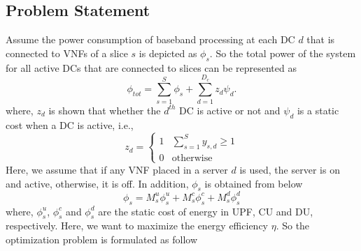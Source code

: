 \documentclass[conference]{IEEEtran}
\begin{document}
\subsection{Problem Statement}
Assume the power consumption of baseband processing at each DC $d$ that is connected to VNFs of a slice $s$ is depicted as
$\phi_{s}$. So the total power of the system for all active DCs that are connected to slices can be represented as
\begin{equation*}
\textstyle \phi_{tot} = \sum_{s=1}^{S}\phi_{s} + \sum_{d=1}^{D_c}z_d \psi_d .
\end{equation*}
where, $z_d$ is shown that whether the $d^{th}$ DC is active or not and $\psi_d$ is a static cost when a DC is active, i.e.,
\begin{equation}
  z_d =
    \begin{cases}
      1 & \sum_{s=1}^{S}y_{s,d} \geq 1 \\
      0 & \text{otherwise}
    \end{cases}       
\end{equation}  
Here, we assume that if any VNF placed in a server $d$ is used, the server is on and active, otherwise, it is off.
In addition, $\phi_{s}$ is obtained from below
\begin{equation}
\phi_{s} = M_s^u \phi_s^u + M_s^c \phi_s^c+ M_s^d \phi_s^d
\end{equation}
where, $\phi_s^u$, $\phi_s^c$ and $\phi_s^d$ are the static cost of energy in UPF, CU and DU, respectively.
Here, we want to maximize the energy efficiency $\eta$. 
So the optimization problem is formulated as follow
\end{document}
